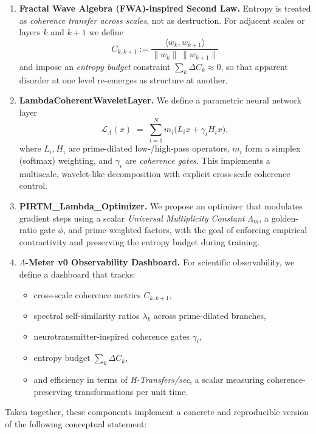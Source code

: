 \documentclass[11pt]{article}
\begin{document}
\begin{enumerate}[label=\textbf{E\arabic*}.]
  \item \textbf{Fractal Wave Algebra (FWA)-inspired Second Law.} Entropy is treated as \emph{coherence transfer across scales}, not as destruction. For adjacent scales or layers $k$ and $k{+}1$ we define
  \[
    C_{k,k+1}
    := \frac{\langle w_k, w_{k+1}\rangle}{\|w_k\| \,\|w_{k+1}\|}
  \]
  and impose an \emph{entropy budget} constraint $\sum_k \Delta C_k \approx 0$, so that apparent disorder at one level re-emerges as structure at another.

  \item \textbf{LambdaCoherentWaveletLayer.} We define a parametric neural network layer
  \[
    \mathcal{L}_\Lambda(x) \;=\; \sum_{i=1}^N m_i \bigl(L_i x + \gamma_i H_i x\bigr),
  \]
  where $L_i,H_i$ are prime-dilated low-/high-pass operators, $m_i$ form a simplex (softmax) weighting, and $\gamma_i$ are \emph{coherence gates}. This implements a multiscale, wavelet-like decomposition with explicit cross-scale coherence control.

  \item \textbf{PIRTM\_Lambda\_Optimizer.} We propose an optimizer that modulates gradient steps using a scalar \emph{Universal Multiplicity Constant} $\Lambda_m$, a golden-ratio gate $\phi$, and prime-weighted factors, with the goal of enforcing empirical contractivity and preserving the entropy budget during training.

  \item \textbf{$\Lambda$-Meter v0 Observability Dashboard.} For scientific observability, we define a dashboard that tracks:
  \begin{itemize}
    \item cross-scale coherence metrics $C_{k,k+1}$,
    \item spectral self-similarity ratios $\lambda_k$ across prime-dilated branches,
    \item neurotransmitter-inspired coherence gates $\gamma_i$,
    \item entropy budget $\sum_k \Delta C_k$,
    \item and efficiency in terms of \emph{H-Transfers/sec}, a scalar measuring coherence-preserving transformations per unit time.
  \end{itemize}
\end{enumerate}

Taken together, these components implement a concrete and reproducible version of the following conceptual statement:
\end{document}
